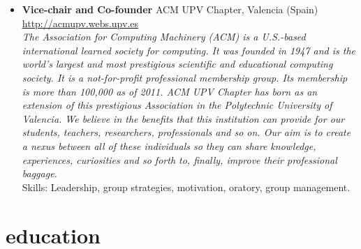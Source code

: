 \documentclass[]{friggeri-cv}
\renewenvironment{entrylist}{%
  \begin{itemize}[leftmargin=1in]%
}{%
  \end{itemize}
}
\renewcommand{\entry}[4]{%
  \item[#1]
    \textbf{#2}%
    \hfill%
    {\footnotesize\addfontfeature{Color=lightgray} #3}\\%
    #4\vspace{\parsep}%
  }
\begin{document}
\begin{entrylist}
  \entry
    {Jul13 Jul14}
    {Vice-chair and Co-founder}
    {ACM UPV Chapter, Valencia (Spain)\\
    \href{http://acmupv.webs.upv.es}{http://acmupv.webs.upv.es}}
    {\emph{The Association for Computing Machinery (ACM) is a U.S.-based international learned society for computing. It was founded in 1947 and is the world's largest and most prestigious scientific and educational computing society. It is a not-for-profit professional membership group. Its membership is more than 100,000 as of 2011.
    ACM UPV Chapter has born as an extension of this prestigious Association in the Polytechnic University of Valencia. We believe in the benefits that this institution can provide for our students, teachers, researchers, professionals and so on. Our aim is to create a nexus between all of these individuals so they can share knowledge, experiences, curiosities and so forth to, finally, improve their professional baggage.}\\
    Skills: Leadership, group strategies, motivation, oratory, group management.}
\end{entrylist}
\section{education}
\end{document}
